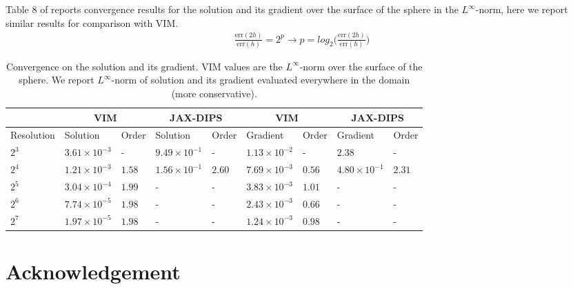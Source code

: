 \documentclass{elsarticle}
\begin{document}
Table 8 of \cite{guittet2015solving} reports convergence results for the solution and its gradient over the surface of the sphere in the $L^\infty$-norm, here we report similar results for comparison with VIM. 
\begin{align*}
\frac{\textrm{err}(2h)}{\textrm{err}(h)}=2^p \rightarrow p = log_2\bigg(\frac{\textrm{err}(2h)}{\textrm{err}(h)}\bigg)
\end{align*}


\begin{table}[ht]
\begin{center}
\begin{tabular}{|l||ll|ll|ll|ll|}
\hline
& \multicolumn{2}{c|}{VIM}& \multicolumn{2}{c|}{JAX-DIPS} & \multicolumn{2}{|c|}{VIM}& \multicolumn{2}{c|}{JAX-DIPS}\\
\hline
Resolution   &   Solution    &   Order   &   Solution   &   Order &   Gradient    &   Order   &   Gradient   &   Order  \\
\hline
$2^3$ & $3.61\times 10^{-3}$ & -         & $9.49\times 10^{-1}$ & -      & $1.13\times 10^{-2}$ & -      & $2.38$               & -     \\ 
$2^4$ & $1.21\times 10^{-3}$ & $1.58$    & $1.56\times 10^{-1}$ & $2.60$ & $7.69\times 10^{-3}$ & $0.56$ & $4.80\times 10^{-1}$ & $2.31$\\ 
$2^5$ & $3.04\times 10^{-4}$ & $1.99$    & - & - & $3.83\times 10^{-3}$ & $1.01$ & - & -\\ 
$2^6$ & $7.74\times 10^{-5}$ & $1.98$    & - & - & $2.43\times 10^{-3}$ & $0.66$ & - & -\\ 
$2^7$ & $1.97\times 10^{-5}$ & $1.98$    & - & - & $1.24\times 10^{-3}$ & $0.98$ & - & -\\ \hline
\end{tabular}
\caption{Convergence on the solution and its gradient. VIM values are the $L^\infty$-norm over the surface of the sphere. We report $L^\infty$-norm of solution and its gradient evaluated everywhere in the domain (more conservative).}
\end{center}
\end{table}




\section*{Acknowledgement}



\newpage


\end{document}
